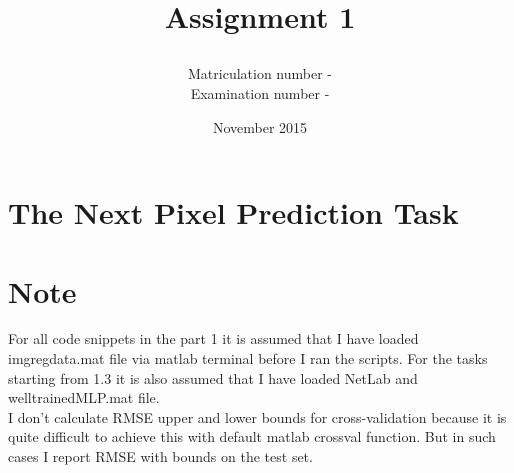 \documentclass{article}
\title{\subject\\Assignment 1}
\date{November 2015}
\author{Matriculation number - \matricno\\Examination number - \exmno}
\begin{document}
\maketitle
	\section{The Next Pixel Prediction Task}
		\section*{Note} 
			 For all code snippets in the part 1 it is assumed that I have loaded imgregdata.mat file via matlab terminal before I ran the scripts. For the tasks starting from 1.3 it is also assumed that I have loaded NetLab and welltrainedMLP.mat file.\\ I don't calculate RMSE upper and lower bounds for cross-validation because it is quite difficult to achieve this with default matlab crossval function. But in such cases I report RMSE with bounds on the test set.
\end{document}
